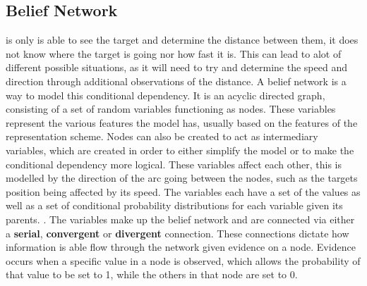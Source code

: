 \subsection{Belief Network}
\name is only is able to see the
target and determine the distance between them, it does not know where the
target is going nor how fast it is. This can lead to alot of different possible
situations, as it will need to try and determine the speed and direction through
additional observations of the distance. A belief network is a way to model
this conditional dependency. It is an acyclic directed graph, consisting of a
set of random variables functioning as nodes. These variables represent the
various features the model has, usually based on the features of
the representation scheme. Nodes can also be created to act as
intermediary variables, which are created in order to either simplify the model
or to make the conditional dependency more logical. These variables affect each
other, this is modelled by the direction of the arc going between the nodes,
such as the targets position being affected by its speed. The variables each
have a set of the values as well as a set of conditional probability
distributions for each variable given its parents. \citep[ch.6.3]{MIBook}.
The variables make up the belief network and are connected via either a
\textbf{serial}, \textbf{convergent} or \textbf{divergent} connection. These
connections dictate how information is able flow through the network given
evidence on a node. Evidence occurs when a specific value in a node is observed,
which allows the probability of that value to be set to 1, while the others in
that node are set to 0.
